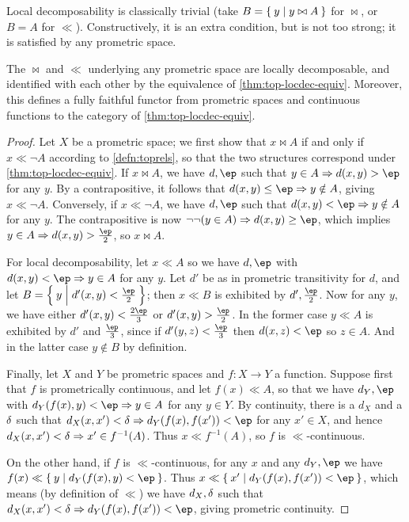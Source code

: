\documentclass{article}
\def\cpl#1{\neg #1}
\let\implies\Rightarrow
\def\inv{^{-1}}
\def\hfep{\frac{\ep}{2}}
\begin{document}
Local decomposability is classically trivial (take $B=\Set{y|y\bowtie A}$ for $\bowtie$, or $B=A$ for $\ll$).
Constructively, it is an extra condition, but is not too strong; it is satisfied by any prometric space.

\begin{thm}
  The $\bowtie$ and $\ll$ underlying any prometric space are locally decomposable, and identified with each other by the equivalence of \cref{thm:top-locdec-equiv}.
  Moreover, this defines a fully faithful functor from prometric spaces and continuous functions to the category of \cref{thm:top-locdec-equiv}.
\end{thm}
\begin{proof}
  Let $X$ be a prometric space; we first show that $x\bowtie A$ if and only if $x\ll \cpl{A}$ according to \cref{defn:toprels}, so that the two structures correspond under \cref{thm:top-locdec-equiv}.
  If $x\bowtie A$, we have $d,\ep$ such that $y\in A \implies d(x,y)>\ep$ for any $y$.
  By a contrapositive, it follows that $d(x,y)\le \ep \implies y\notin A$, giving $x\ll \cpl{A}$.
  Conversely, if $x\ll\cpl{A}$, we have $d,\ep$ such that $d(x,y)< \ep \implies y\notin A$ for any $y$.
  The contrapositive is now $\neg\neg(y\in A) \implies d(x,y)\ge \ep$, which implies $y\in A \implies d(x,y)> \hfep$, so $x\bowtie A$.

  For local decomposability, let $x\ll A$ so we have $d,\ep$ with $d(x,y)< \ep \implies y\in A$ for any $y$.
  Let $d'$ be as in prometric transitivity for $d$, and let $B = \setof{y|d'(x,y)<\hfep}$; then $x\ll B$ is exhibited by $d',\hfep$.
  Now for any $y$, we have either $d'(x,y)<\frac{2\ep}{3}$ or $d'(x,y)>\hfep$.
  In the former case $y\ll A$ is exhibited by $d'$ and $\frac{\ep}{3}$, since if $d'(y,z)<\frac{\ep}{3}$ then $d(x,z)<\ep$ so $z\in A$.
  And in the latter case $y\notin B$ by definition.

  Finally, let $X$ and $Y$ be prometric spaces and $f:X\to Y$ a function.
  Suppose first that $f$ is prometrically continuous, and let $f(x)\ll A$, so that we have $d_Y,\ep$ with $d_Y(f(x),y)< \ep \implies y\in A$ for any $y\in Y$.
  By continuity, there is a $d_X$ and a $\delta$ such that $d_X(x,x')<\de \implies d_Y(f(x),f(x'))<\ep$ for any $x'\in X$, and hence $d_X(x,x')<\de \implies x'\in f\inv(A)$.
  Thus $x\ll f\inv(A)$, so $f$ is $\ll$-continuous.

  On the other hand, if $f$ is $\ll$-continuous, for any $x$ and any $d_Y,\ep$ we have $f(x)\ll \setof{y|d_Y(f(x),y)<\ep}$.
  Thus $x\ll \setof{x'|d_Y(f(x),f(x'))<\ep}$, which means (by definition of $\ll$) we have $d_X,\delta$ such that $d_X(x,x')<\de \implies d_Y(f(x),f(x'))<\ep$, giving prometric continuity.
\end{proof}
\end{document}
